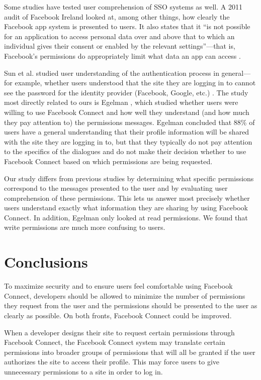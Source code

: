 \documentclass[10pt]{sig-alternate-10pt}
\begin{document}
Some studies have tested user comprehension of SSO systems as well. A 2011 audit of Facebook Ireland looked at, among other things, how clearly the Facebook app system is presented to users. It also states that it ``is not possible for an application to access personal data over and above that to which an individual gives their consent or enabled by the relevant settings''---that is, Facebook's permissions do appropriately limit what data an app can access \cite{irishaudit}.

Sun et al. studied user understanding of the authentication process in general---for example, whether users understood that the site they are logging in to cannot see the password for the identity provider (Facebook, Google, etc.) \cite{ssoperspective}. The study most directly related to ours is Egelman \cite{egelman}, which studied whether users were willing to use Facebook Connect and how well they understand (and how much they pay attention to) the permissions messages. Egelman concluded that 88\% of users have a general understanding that their profile information will be shared with the site they are logging in to, but that they typically do not pay attention to the specifics of the dialogues and do not make their decision whether to use Facebook Connect based on which permissions are being requested.

Our study differs from previous studies by determining what specific permissions correspond to the messages presented to the user and by evaluating user comprehension of these permissions. This lets us answer most precisely whether users understand exactly what information they are sharing by using Facebook Connect. In addition, Egelman only looked at read permissions. We found that write permissions are much more confusing to users.


\section{Conclusions}

To maximize security and to ensure users feel comfortable using Facebook Connect, developers should be allowed to minimize the number of permissions they request from the user and the permissions should be presented to the user as clearly as possible. On both fronts, Facebook Connect could be improved.

When a developer designs their site to request certain permissions through Facebook Connect, the Facebook Connect system may translate certain permissions into broader groups of permissions that will all be granted if the user authorizes the site to access their profile. This may force users to give unnecessary permissions to a site in order to log in. 
\end{document}
